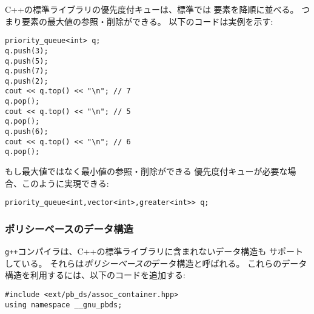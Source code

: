 \begin{samepage}

\begin{comment}
By default, the elements in a C++
priority queue are sorted in decreasing order,
and it is possible to find and remove the
largest element in the queue.
The following code illustrates this:
\end{comment}

C++の標準ライブラリの優先度付キューは、標準では
要素を降順に並べる。
つまり要素の最大値の参照・削除ができる。
以下のコードは実例を示す:

\begin{lstlisting}
priority_queue<int> q;
q.push(3);
q.push(5);
q.push(7);
q.push(2);
cout << q.top() << "\n"; // 7
q.pop();
cout << q.top() << "\n"; // 5
q.pop();
q.push(6);
cout << q.top() << "\n"; // 6
q.pop();
\end{lstlisting}
\end{samepage}

\begin{comment}
If we want to create a priority queue
that supports finding and removing
the smallest element,
we can do it as follows:
\end{comment}

もし最大値ではなく最小値の参照・削除ができる
優先度付キューが必要な場合、このように実現できる:

\begin{lstlisting}
priority_queue<int,vector<int>,greater<int>> q;
\end{lstlisting}

\begin{comment}
\subsubsection{Policy-based data structures}

The \texttt{g++} compiler also supports
some data structures that are not part
of the C++ standard library.
Such structures are called \emph{policy-based}
data structures.
To use these structures, the following lines
must be added to the code:
\end{comment}

\subsubsection{ポリシーベースのデータ構造}

\texttt{g++}コンパイラは、C++の標準ライブラリに含まれないデータ構造も
サポートしている。
それらは\emph{ポリシーベースの}データ構造と呼ばれる。
これらのデータ構造を利用するには、以下のコードを追加する:
\begin{lstlisting}
#include <ext/pb_ds/assoc_container.hpp>
using namespace __gnu_pbds; 
\end{lstlisting}

